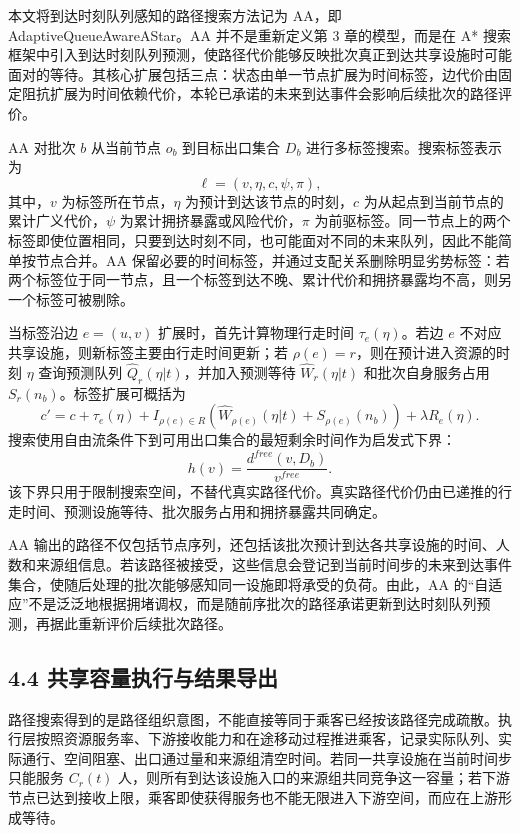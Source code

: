 \documentclass[UTF8,a4paper,12pt]{ctexart}
\begin{document}
本文将到达时刻队列感知的路径搜索方法记为 AA，即 AdaptiveQueueAwareAStar。AA 并不是重新定义第 3 章的模型，而是在 A* 搜索框架中引入到达时刻队列预测，使路径代价能够反映批次真正到达共享设施时可能面对的等待。其核心扩展包括三点：状态由单一节点扩展为时间标签，边代价由固定阻抗扩展为时间依赖代价，本轮已承诺的未来到达事件会影响后续批次的路径评价。

AA 对批次 \(b\) 从当前节点 \(o_b\) 到目标出口集合 \(D_b\) 进行多标签搜索。搜索标签表示为
\[
\ell=(v,\eta,c,\psi,\pi),
\]
其中，\(v\) 为标签所在节点，\(\eta\) 为预计到达该节点的时刻，\(c\) 为从起点到当前节点的累计广义代价，\(\psi\) 为累计拥挤暴露或风险代价，\(\pi\) 为前驱标签。同一节点上的两个标签即使位置相同，只要到达时刻不同，也可能面对不同的未来队列，因此不能简单按节点合并。AA 保留必要的时间标签，并通过支配关系删除明显劣势标签：若两个标签位于同一节点，且一个标签到达不晚、累计代价和拥挤暴露均不高，则另一个标签可被剔除。

当标签沿边 \(e=(u,v)\) 扩展时，首先计算物理行走时间 \(\tau_e(\eta)\)。若边 \(e\) 不对应共享设施，则新标签主要由行走时间更新；若 \(\rho(e)=r\)，则在预计进入资源的时刻 \(\eta\) 查询预测队列 \(\widehat Q_r(\eta|t)\)，并加入预测等待 \(\widehat W_r(\eta|t)\) 和批次自身服务占用 \(S_r(n_b)\)。标签扩展可概括为
\[
c'=c+\tau_e(\eta)+
I_{\rho(e)\in R}
\left(
\widehat W_{\rho(e)}(\eta|t)+S_{\rho(e)}(n_b)
\right)
+\lambda R_e(\eta).
\]
搜索使用自由流条件下到可用出口集合的最短剩余时间作为启发式下界：
\[
h(v)=\frac{d^{free}(v,D_b)}{v^{free}}.
\]
该下界只用于限制搜索空间，不替代真实路径代价。真实路径代价仍由已递推的行走时间、预测设施等待、批次服务占用和拥挤暴露共同确定。

AA 输出的路径不仅包括节点序列，还包括该批次预计到达各共享设施的时间、人数和来源组信息。若该路径被接受，这些信息会登记到当前时间步的未来到达事件集合，使随后处理的批次能够感知同一设施即将承受的负荷。由此，AA 的“自适应”不是泛泛地根据拥堵调权，而是随前序批次的路径承诺更新到达时刻队列预测，再据此重新评价后续批次路径。

\subsection{4.4 共享容量执行与结果导出}

路径搜索得到的是路径组织意图，不能直接等同于乘客已经按该路径完成疏散。执行层按照资源服务率、下游接收能力和在途移动过程推进乘客，记录实际队列、实际通行、空间阻塞、出口通过量和来源组清空时间。若同一共享设施在当前时间步只能服务 \(C_r(t)\) 人，则所有到达该设施入口的来源组共同竞争这一容量；若下游节点已达到接收上限，乘客即使获得服务也不能无限进入下游空间，而应在上游形成等待。
\end{document}
